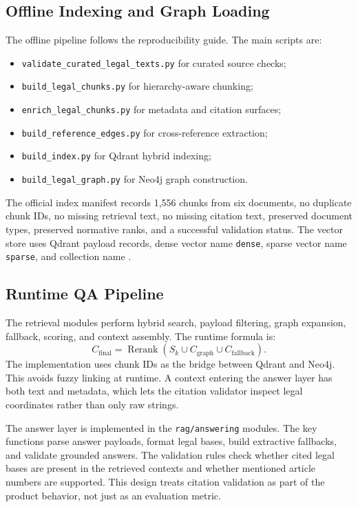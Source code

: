 \subsection{Offline Indexing and Graph Loading}
The offline pipeline follows the reproducibility guide. The main scripts are:
\begin{itemize}
  \item \texttt{validate\_curated\_legal\_texts.py} for curated source checks;
  \item \texttt{build\_legal\_chunks.py} for hierarchy-aware chunking;
  \item \texttt{enrich\_legal\_chunks.py} for metadata and citation surfaces;
  \item \texttt{build\_reference\_edges.py} for cross-reference extraction;
  \item \texttt{build\_index.py} for Qdrant hybrid indexing;
  \item \texttt{build\_legal\_graph.py} for Neo4j graph construction.
\end{itemize}

The official index manifest records 1,556 chunks from six documents, no duplicate chunk IDs, no missing retrieval text, no missing citation text, preserved document types, preserved normative ranks, and a successful validation status. The vector store uses Qdrant payload records, dense vector name \texttt{dense}, sparse vector name \texttt{sparse}, and collection name .

\subsection{Runtime QA Pipeline}
The retrieval modules perform hybrid search, payload filtering, graph expansion, fallback, scoring, and context assembly. The runtime formula is:
\[
C_{\mathrm{final}} =
\operatorname{Rerank}(S_k \cup C_{\mathrm{graph}} \cup C_{\mathrm{fallback}}).
\]
The implementation uses chunk IDs as the bridge between Qdrant and Neo4j. This avoids fuzzy linking at runtime. A context entering the answer layer has both text and metadata, which lets the citation validator inspect legal coordinates rather than only raw strings.

The answer layer is implemented in the \texttt{rag/answering} modules. The key functions parse answer payloads, format legal bases, build extractive fallbacks, and validate grounded answers. The validation rules check whether cited legal bases are present in the retrieved contexts and whether mentioned article numbers are supported. This design treats citation validation as part of the product behavior, not just as an evaluation metric.

